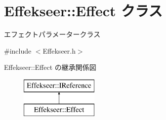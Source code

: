 \hypertarget{class_effekseer_1_1_effect}{}\section{Effekseer\+:\+:Effect クラス}
\label{class_effekseer_1_1_effect}


エフェクトパラメータークラス  




{\ttfamily \#include $<$Effekseer.\+h$>$}

Effekseer\+:\+:Effect の継承関係図\begin{figure}[H]
\begin{center}
\leavevmode
\includegraphics[height=2.000000cm]{class_effekseer_1_1_effect}
\end{center}
\end{figure}
